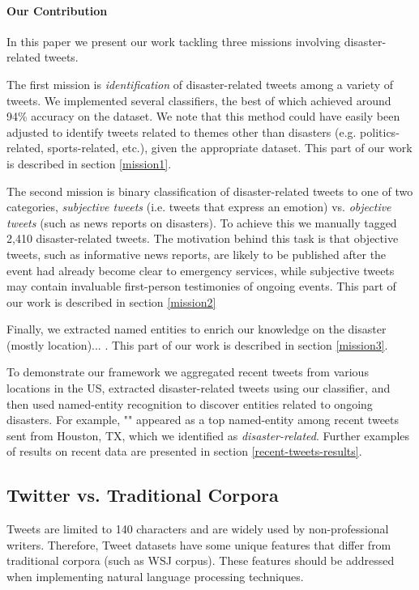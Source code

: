 \documentclass[letterpaper,twocolumn,10pt]{article}
\begin{document}
\paragraph{Our Contribution}

In this paper we present our work tackling three missions involving disaster-related tweets.

The first mission is \textit{identification} of disaster-related tweets among a variety of tweets. We implemented several classifiers, the best of which achieved around 94\% accuracy on the dataset. We note that this method could have easily been adjusted to identify tweets related to themes other than disasters (e.g. politics-related, sports-related, etc.), given the appropriate dataset. This part of our work is described in section \ref{mission1}.

The second mission is binary classification of disaster-related tweets to one of two categories, \textit{subjective tweets} (i.e. tweets that express an emotion) vs. \textit{objective tweets} (such as news reports on disasters). To achieve this we manually tagged 2,410 disaster-related tweets. The motivation behind this task is that objective tweets, such as informative news reports, are likely to be published after the event had already become clear to emergency services, while subjective tweets may contain invaluable first-person testimonies of ongoing events. This part of our work is described in section \ref{mission2}

Finally, we extracted named entities to enrich our knowledge on the disaster (mostly location)... . This part of our work is described in section \ref{mission3}.

To demonstrate our framework we aggregated recent tweets from various locations in the US, extracted disaster-related tweets using our classifier, and then used named-entity recognition to discover entities related to ongoing disasters. For example, "" appeared as a top named-entity among recent tweets sent from Houston, TX, which we identified as \textit{disaster-related}. Further examples of results on recent data are presented in section \ref{recent-tweets-results}.

\subsection{Twitter vs. Traditional Corpora}

Tweets are limited to 140 characters and are widely used by non-professional writers. Therefore, Tweet datasets have some unique features that differ from traditional corpora (such as WSJ corpus). These features should be addressed when implementing natural language processing techniques.
\end{document}
